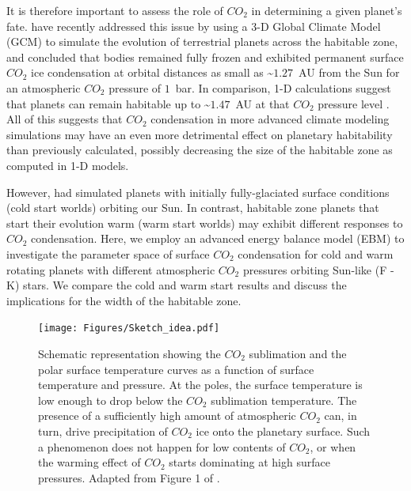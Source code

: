 \documentclass[fleqn,usenatbib]{mnras}
\begin{document}
It is therefore important to assess the role of $CO_{\mathrm{2}}$ in determining a given planet's fate. \citet{Turbet2017} have recently addressed this issue by using a 3-D Global Climate Model (GCM) to simulate the evolution of terrestrial planets across the habitable zone, and concluded that bodies remained fully frozen and exhibited permanent surface $CO_{\mathrm{2}}$ ice condensation at orbital distances as small as \textasciitilde $1.27$~AU from the Sun for an atmospheric $CO_{\mathrm{2}}$ pressure of $1$~bar. In comparison, 1-D calculations suggest that planets can remain habitable up to \textasciitilde $1.47$~AU at that $CO_{\mathrm{2}}$ pressure level \citep{kasting1993,KumarKopparapu2013, Ramirez2018}. 
All of this suggests that $CO_{\mathrm{2}}$ condensation in more advanced climate modeling simulations may have an even more detrimental effect on planetary habitability than previously calculated, possibly decreasing the size of the habitable zone as computed in 1-D models.

However, \citet{Turbet2017} had simulated planets with initially fully-glaciated surface conditions (cold start worlds) orbiting our Sun. In contrast, habitable zone planets that start their evolution warm (warm start worlds) may exhibit different responses to $CO_{\mathrm{2}}$ condensation. Here, we employ an advanced energy balance model (EBM) to investigate the parameter space of surface $CO_{\mathrm{2}}$ condensation for cold and warm rotating planets with different atmospheric $CO_{\mathrm{2}}$ pressures orbiting Sun-like (F - K) stars. We compare the cold and warm start results and discuss the implications for the width of the habitable zone.

\begin{figure}
	\texttt{[image: Figures/Sketch\_idea.pdf]}
    \caption{Schematic representation showing the $CO_{\mathrm{2}}$ sublimation and the polar surface temperature curves as a function of surface temperature and pressure. At the poles, the surface temperature is low enough to drop below the $CO_{\mathrm{2}}$ sublimation temperature. The presence of a sufficiently high amount of atmospheric $CO_{\mathrm{2}}$ can, in turn, drive precipitation of $CO_{\mathrm{2}}$ ice onto the planetary surface. 
    Such a phenomenon does not happen for low contents of $CO_{\mathrm{2}}$, or when the warming effect of $CO_{\mathrm{2}}$ starts dominating at high surface pressures. Adapted from Figure 1 of \citet{Soto2015}.}
    \label{fig:Sketch}
\end{figure}
\end{document}
